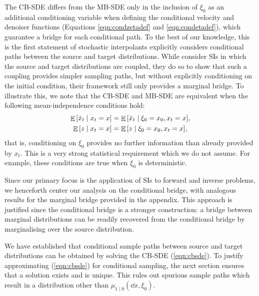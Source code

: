 The CB-SDE differs from the MB-SDE only in the inclusion of \(\xi_{0}\) as an additional conditioning variable when defining the conditional velocity and denoiser functions (Equations \ref{eqn:condzetadef} and \ref{eqn:condetadef}), which guarantee a bridge for each conditional path. To the best of our knowledge, this is the first statement of stochastic interpolants explicitly considers conditional paths between the source and target distributions. While \citet{albergo2023stochastic} consider SIs in which the source and target distributions are coupled, they do so to show that such a coupling provides simpler sampling paths, but without explicitly conditioning on the initial condition, their framework still only provides a marginal bridge. To illustrate this, we note that the CB-SDE and MB-SDE are equivalent when the following mean-independence conditions hold:
\begin{align*}
  \mathop{\mathbb{E}}\qty[\dot{x}_{t} \mid x_{t} = x] &= \mathop{\mathbb{E}}\qty[\dot{x}_{t} \mid \xi_{0} = x_{0}, x_{t} = x], \\
  \mathop{\mathbb{E}}\qty[z \mid x_{t} = x] &= \mathop{\mathbb{E}}\qty[z \mid \xi_{0} = x_{0}, x_{t} = x],
\end{align*}
that is, conditioning on \(\xi_{0}\) provides no further information than already provided by \(x_{t}\). This is a very strong statistical requirement which we do not assume. For example, these conditions are true when \(\xi_{0}\) is deterministic. %

Since our primary focus is the application of SIs to forward and inverse problems, we henceforth center our analysis on the conditional bridge, with analogous results for the marginal bridge provided in the appendix. This approach is justified since the conditional bridge is a stronger construction: a bridge between marginal distributions can be readily recovered from the conditional bridge by marginalising over the source distribution. %

We have established that conditional sample paths between source and target distributions can be obtained by solving the CB-SDE (\ref{eqn:cbsde}). To justify approximating (\ref{eqn:cbsde}) for conditional sampling, the next section ensures that a solution exists and is unique. This rules out spurious sample paths which result in a distribution other than \(\mu_{1\mid 0}(\dd{x}, \xi_{0})\).

